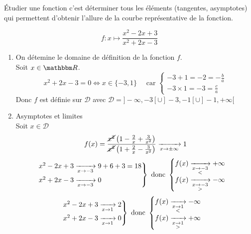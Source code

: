 \pagebreak
\'Etudier une fonction c'est déterminer tous les éléments (tangentes, asymptotes) qui permettent d'obtenir l'allure de la courbe représentative de la fonction.\\

\begin{exm}
	\[
		f: x \mapsto  \frac{x^2-2x+3}{x^2+2x-3}
	\] 
	\begin{enumerate}
		\item On détemine le domaine de définition de la fonction $f$.\\
			Soit $x \in \R$. \[
				x^2+2x-3 = 0 \iff x \in \{-3,1\} \quad \text{ car }
				\begin{cases}
					-3 + 1 = -2 = -\frac{b}{a}\\
					-3 \times 1 = -3 = \frac{c}{a}
				\end{cases}
			\] Donc $f$ est définie sur $\mathcal{D}$ avec $\mathcal{D} = ]-\infty, -3[ \cup ]-3,-1[ \cup ]-1, +\infty[$
		\item Asymptotes et limites\\
			Soit $x \in \mathcal{D}$\\
			\[
				f(x) = \frac{\cancel{x^2}\left( 1-\frac{2}{x}+\frac{3}{x^2} \right)}{\cancel{x^2}\left( 1+\frac{2}{x}-\frac{3}{x^2} \right) }
				\xrightarrow[x\to \pm \infty]{} 1
			\] 
			\[
				\begin{rcases*}
					x^2-2x + 3 \tendsto{x\to -3} 9+6+3 = 18\\
					x^2+ 2x - 3 \tendsto{x\to -3} 0
				\end{rcases*} \text{ donc }
				\begin{cases}
					f(x) \tendsto{\substack{x \to -3\\<}} +\infty\\
					f(x) \tendsto{\substack{x \to -3\\>}} -\infty\\
				\end{cases}
			\]\[
				\begin{rcases*}
					x^2-2x + 3 \tendsto{x\to 1} 2\\
					x^2+ 2x - 3 \tendsto{x\to 1} 0
				\end{rcases*} \text{ donc }
				\begin{cases}
					f(x) \tendsto{\substack{x \to 1\\<}} -\infty\\
					f(x) \tendsto{\substack{x \to 1\\>}} +\infty\\
				\end{cases}
\]
\end{enumerate}
\end{exm}
